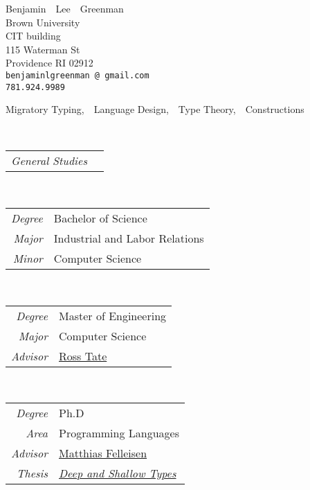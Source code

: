 \documentclass{article}
\makeatletter
\renewcommand{\maketitle}{
\begin{center}
  {\large{Benjamin~~Lee~~Greenman}}
\vspace{0.1cm}
\\Brown University
\\CIT building
\\115 Waterman St
\\Providence RI 02912
\\\texttt{benjaminlgreenman\,@\,gmail.com}
\\\texttt{781.924.9989}
\end{center}
}
\makeatother
\begin{document}
\maketitle



Migratory Typing,~~Language Design,~~Type Theory,~~Constructions


 \hfill {}\\
\begin{tabular}{>{\it}r l}
General Studies & \\
\end{tabular}

 \hfill {}\\
\begin{tabular}{>{\it}r l}
Degree & Bachelor of Science\\
Major & Industrial and Labor Relations\\
Minor & Computer Science\\
\end{tabular}

 \hfill {}\\
\begin{tabular}{>{\it}r l}
Degree & Master of Engineering\\
Major & Computer Science\\
Advisor & \href{http://www.cs.cornell.edu/~ross/}{Ross Tate}
\end{tabular}

 \hfill {}\\
\begin{tabular}{>{\it}r l}
Degree & Ph.D \\
Area & Programming Languages \\
Advisor & \href{http://ccs.neu.edu/home/matthias}{Matthias Felleisen} \\
Thesis & \href{http://ccs.neu.edu/home/types/resources/pdf/g-dissertation-2020.pdf}{\emph{Deep and Shallow Types}}
\end{tabular}
\end{document}
